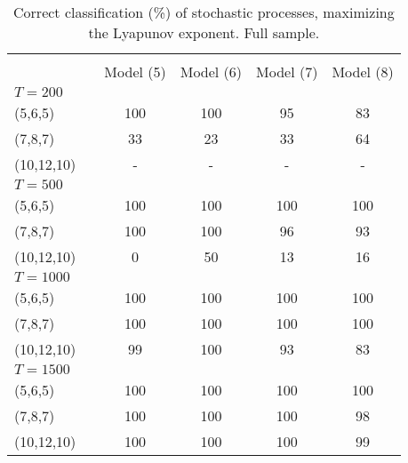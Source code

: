 \documentclass[12pt]{article}
\begin{document}
\begin{table} [H]\scriptsize
    \caption{ Correct classification (\%) of stochastic processes, maximizing the Lyapunov exponent. Full sample.}
    \begin{tabular*}{\textwidth}{@{\extracolsep{\fill}}lccccc}
        \hline &  &  &  & &   \\ 
          &  &  Model (5) & Model (6)  & Model (7) & Model (8)  \\ 
        $T=200$  &  &  &  & &   \\
        (5,6,5)                           &  & 100 & 100  & 95 & 83 \\ 
        (7,8,7)                           &  & 33  &  23  & 33 & 64 \\ 
        (10,12,10)                        &  &  -  & -    & -  & -\\ 
        \hline 
                
         $T=500$  &  &   & & &   \\ 

        (5,6,5)                           &  & 100 & 100  & 100 & 100 \\ 
        (7,8,7)                           &  & 100 & 100  & 96  & 93 \\ 
        (10,12,10)                        &  & 0   & 50   &  13 & 16  \\ 
\hline 
         $T=1000$  &  &   &   &  &  \\ 

        (5,6,5)                           &  &  100   & 100 & 100 & 100   \\ 
        (7,8,7)                           &  &  100   & 100 & 100 & 100\\ 
        (10,12,10)                        &  &  99    & 100 & 93  & 83  \\ 
\hline      
         $T=1500$  &  &   &   &  &  \\ 

        (5,6,5)                           &  &   100   & 100 & 100 & 100 \\ 
        (7,8,7)                           &  &   100   & 100 & 100 & 98  \\ 
        (10,12,10)                        &  &   100   & 100 & 100 & 99 \\ 
\hline      
    \end{tabular*}
\end{table}
\end{document}
